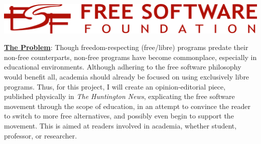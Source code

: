 \documentclass[12pt]{article}
\begin{document}
\begin{center}
  \includegraphics[width=.9\textwidth]{Images/FSFLogo.png}
\end{center}

\begin{tcolorbox}[colframe=red!65,colback=red!10]

  \underline{\textbf{The Problem}}: Though freedom-respecting (free/libre) programs predate their non-free counterparts, non-free programs have become commonplace, especially in educational environments. Although adhering to the free software philosophy would benefit all, academia should already be focused on using exclusively libre programs. Thus, for this project, I will create an opinion-editorial piece, published physically in \textit{The Huntington News}, explicating the free software movement through the scope of education, in an attempt to convince the reader to switch to more free alternatives, and possibly even begin to support the movement. This is aimed at readers involved in academia, whether student, professor, or researcher.

\end{tcolorbox}
\end{document}
